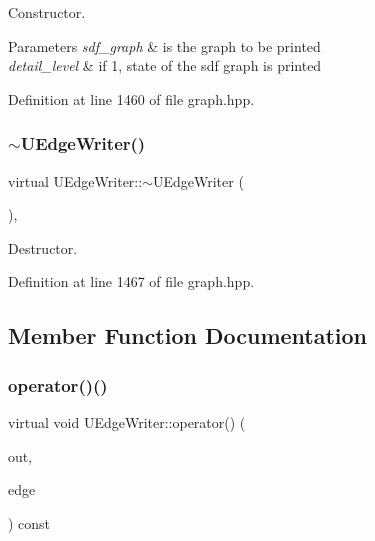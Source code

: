 Constructor. 


\begin{DoxyParams}{Parameters}
{\em sdf\+\_\+graph} & is the graph to be printed \\
\hline
{\em detail\+\_\+level} & if 1, state of the sdf graph is printed \\
\hline
\end{DoxyParams}


Definition at line 1460 of file graph.\+hpp.

\mbox{\label{classUEdgeWriter_adb9f1bfaaf9450c36be84d2b2479e28b}} 
\subsubsection{\texorpdfstring{$\sim$\+U\+Edge\+Writer()}{~UEdgeWriter()}}
{\footnotesize\ttfamily virtual U\+Edge\+Writer\+::$\sim$\+U\+Edge\+Writer (\begin{DoxyParamCaption}{ }\end{DoxyParamCaption})\hspace{0.3cm}{\ttfamily [inline]}, {\ttfamily [virtual]}}



Destructor. 



Definition at line 1467 of file graph.\+hpp.



\subsection{Member Function Documentation}
\mbox{\label{classUEdgeWriter_af58c69e0a206bae565f61ee95b2fcc07}} 
\subsubsection{\texorpdfstring{operator()()}{operator()()}}
{\footnotesize\ttfamily virtual void U\+Edge\+Writer\+::operator() (\begin{DoxyParamCaption}\item[{std\+::ostream \&}]{out,  }\item[{const \hyperlink{graph_8hpp_a2b4fd9c6560ff0335716f4bdbd932aba}{U\+Edge\+Descriptor} \&}]{edge }\end{DoxyParamCaption}) const\hspace{0.3cm}{\ttfamily [pure virtual]}}



